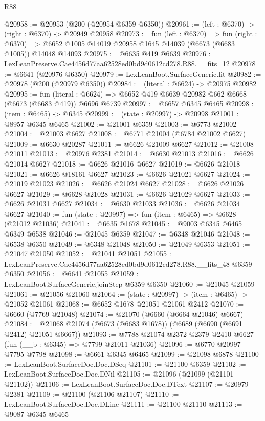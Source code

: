 \begin{lexlean}{R88}
\begin{coremodule}
@20958 := @20953 (@200 (@20954 @6359 @6350))
@20961 := (left : @6370) -> (right : @6370) -> @20949 @20958
@20973 := fun (left : @6370) =>
  fun (right : @6370) => @6652 @1005 @14019 @20958 @1645 @14039 (@6673 (@6683 @1005)) @14048 @14093
@20975 := @6635 @419 @6639
@20976 := LexLeanPreserve.Cae4456d77aa62528ed0bd9d0612cd278.R88.__fits_12
@20978 := @6641 (@20976 @6350)
@20979 := LexLeanBoot.SurfaceGeneric.lit
@20982 := @20978 (@200 (@20979 @6350))
@20984 := (literal : @6624) -> @20975 @20982
@20995 := fun (literal : @6624) =>
  @6652 @419 @6639 @20982 @662 @6668 (@6673 (@6683 @419)) @6696 @6739
@20997 := @6657 @6345 @6465
@20998 := (item : @6465) -> @6345
@20999 := (state : @20997) -> @20998
@21001 := @8957 @6345 @6465
@21002 := @21001 @6359
@21003 := @6773 @21002
@21004 := @21003 @6627
@21008 := @6771 @21004 (@6784 @21002 @6627)
@21009 := @6630 @20287
@21011 := @6626 @21009 @6627
@21012 := @21008 @21011
@21013 := @20976 @2381
@21014 := @6630 @21013
@21016 := @6626 @21014 @6627
@21018 := @6626 @21016 @6627
@21019 := @6626 @21018
@21021 := @6626 @18161 @6627
@21023 := @6626 @21021 @6627
@21024 := @21019 @21023
@21026 := @6626 @21024 @6627
@21028 := @6626 @21026 @6627
@21029 := @6628 @21028
@21031 := @6626 @21029 @6627
@21033 := @6626 @21031 @6627
@21034 := @6630 @21033
@21036 := @6626 @21034 @6627
@21040 := fun (state : @20997) => fun (item : @6465) => @6628 (@21012 @21036)
@21041 := @6635 @1678
@21045 := @9003 @6345 @6465 @6349 @6538
@21046 := @21045 @6359
@21047 := @6348 @21046
@21048 := @6538 @6350
@21049 := @6348 @21048
@21050 := @21049 @6353
@21051 := @21047 @21050
@21052 := @21041 @21051
@21055 := LexLeanPreserve.Cae4456d77aa62528ed0bd9d0612cd278.R88.__fits_48 @6359 @6350
@21056 := @6641 @21055
@21059 := LexLeanBoot.SurfaceGeneric.joinStep @6359 @6350
@21060 := @21045 @21059
@21061 := @21056 @21060
@21064 := (state : @20997) -> (item : @6465) -> @21052 @21061
@21068 := @6652 @1678 @21051 @21061 @2412
@21070 := @6660 (@7769 @21048)
@21074 := @21070 (@6660 (@6664 @21046) @6667)
@21084 := @21068 @21074 (@6673 (@6683 @1678)) (@6689 (@6690 (@6691 @2412) @21051 @6667))
@21093 := @7788 @21074 @2372 @2379 @2410 @6627 (fun (__b : @6345) => @7799 @21011 @21036)
@21096 := @6770 @20997 @7795 @7798
@21098 := @6661 @6345 @6465
@21099 := @21098 @6878
@21100 := LexLeanBoot.SurfaceDoc.Doc.DSeq
@21101 := @21100 @6359
@21102 := LexLeanBoot.SurfaceDoc.Doc.DNil
@21105 := @21096 (@21099 (@21101 @21102))
@21106 := LexLeanBoot.SurfaceDoc.Doc.DText
@21107 := @20979 @2381
@21109 := @21100 (@21106 @21107)
@21110 := LexLeanBoot.SurfaceDoc.Doc.DLine
@21111 := @21100 @21110
@21113 := @9087 @6345 @6465

\end{coremodule}
\end{lexlean}
